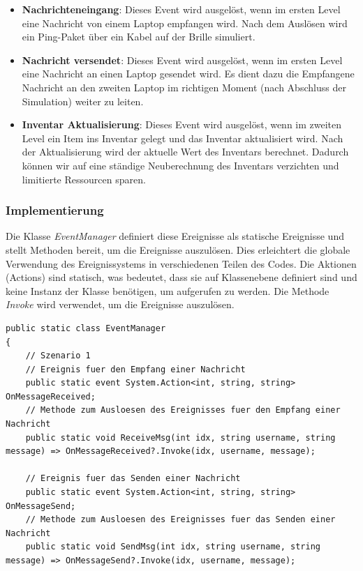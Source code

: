 \begin{itemize}
\begin{itemize}
    \item \textbf{Nachrichteneingang}: Dieses Event wird ausgelöst, wenn im ersten Level eine Nachricht von einem Laptop
    empfangen wird. Nach dem Auslösen wird ein Ping-Paket über ein Kabel auf der Brille simuliert.
    \item \textbf{Nachricht versendet}: Dieses Event wird ausgelöst, wenn im ersten Level eine Nachricht an einen Laptop
    gesendet wird. Es dient dazu die Empfangene Nachricht an den zweiten Laptop im richtigen Moment (nach Abschluss der
    Simulation) weiter zu leiten.
    \item \textbf{Inventar Aktualisierung}: Dieses Event wird ausgelöst, wenn im zweiten Level ein Item ins Inventar gelegt und
    das Inventar aktualisiert wird. Nach der Aktualisierung wird der aktuelle Wert des Inventars berechnet. Dadurch können
    wir auf eine ständige Neuberechnung des Inventars verzichten und limitierte Ressourcen sparen.
\end{itemize}

\subsubsection*{Implementierung}

Die Klasse \textit{EventManager} definiert diese Ereignisse als statische Ereignisse und stellt Methoden bereit, um die
Ereignisse auszulösen. Dies erleichtert die globale Verwendung des Ereignissystems in verschiedenen Teilen des Codes.
Die Aktionen (Actions) sind statisch, was bedeutet, dass sie auf Klassenebene definiert sind und keine Instanz der Klasse
benötigen, um aufgerufen zu werden. Die Methode \textit{Invoke} wird verwendet, um die Ereignisse auszulösen.

\begin{lstlisting}[style=csharp, label=code:EventManager]
public static class EventManager
{
    // Szenario 1
    // Ereignis fuer den Empfang einer Nachricht
    public static event System.Action<int, string, string> OnMessageReceived;
    // Methode zum Ausloesen des Ereignisses fuer den Empfang einer Nachricht
    public static void ReceiveMsg(int idx, string username, string message) => OnMessageReceived?.Invoke(idx, username, message);

    // Ereignis fuer das Senden einer Nachricht
    public static event System.Action<int, string, string> OnMessageSend;
    // Methode zum Ausloesen des Ereignisses fuer das Senden einer Nachricht
    public static void SendMsg(int idx, string username, string message) => OnMessageSend?.Invoke(idx, username, message);


\end{lstlisting}
\end{itemize}
